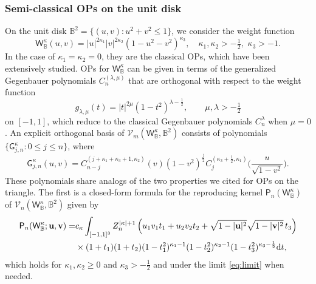 \documentclass{amsart}
\theoremstyle{remark}
\def\d{\mathrm{d}}
\def\sG{{\mathsf G}}
\def\sP{{\mathsf P}}
\def\sW{{\mathsf W}}
\def\k{{\kappa}}
\def\l{{\lambda}}
\def\ub{{\mathbf u}}
\def\vb{{\mathbf v}}
\def\CV{{\mathcal V}}
\def\BB{{\mathbb B}}
\def\f{\frac}
\begin{document}
\subsubsection{Semi-classical OPs on the unit disk}
On the unit disk $\BB^2 = \{(u,v): u^2+v^2 \le 1\}$, we consider the weight function 
\begin{equation}\label{eq:WBk}
    \sW^{\k}_\BB (u,v) = |u|^{2\k_1} |v|^{2\k_2} \left(1-u^2-v^2\right)^{\k_3}, \quad \k_1, \k_2 > -\tfrac12, \,\, \k_3 > -1.
\end{equation}
In the case of $\k_1 = \k_2 = 0$, they are the classical OPs, which have been extensively studied. OPs for
$\sW^\k_\BB$ can be given in terms of the generalized Gegenbauer polynomials $C_n^{(\l,\mu)}$ that are 
orthogonal with respect to the weight function
$$
    g_{\l,\mu} (t) = |t|^{2 \mu} (1-t^2)^{\l-\f12}, \qquad \mu, \l > -\tfrac12 
$$
on $[-1,1]$, which reduce to the classical Gegenbauer polynomials $C_n^\l$ when $\mu  = 0$. 
 An explicit orthogonal basis of $\CV_m(\sW^{\k}_\BB, \BB^2)$ consists of 
polynomials $\{\sG_{j,n}^{\k}: 0 \le j \le n\}$, where \cite{DX} 
\begin{equation}\label{eq:OP_disk}
  \sG_{j,n}^\k (u,v) = C_{n-j}^{(j + \k_1+\k_3 +1,\k_2)}(v) (1-v^2)^{\f{j}{2}} 
                C_j^{(\k_3+\f12,\k_1)} \bigg(\frac{u}{\sqrt{1-v^2}} \bigg). 
\end{equation}
These polynomials share analogs of the two properties we cited for OPs on the triangle. The first is 
a closed-form formula for the reproducing kernel $\sP_n(\sW^\k_\BB)$ of $\CV_n(\sW^\k_\BB, \BB^2)$ 
given by \cite[Theorem 8.1.16]{DX}
\begin{align} \label{eq:reprodB}
\sP_n(\sW^\k_\BB; \ub,\vb) = &  c_\k \int_{[-1,1]^3} Z_n^{|\k|+1} \left(u_1 v_1 t_1+ u_2 v_2 t_2 + 
  \sqrt{1-|\ub|^2} \sqrt{1-|\vb|^2}\, t_3 \right) \\
 & \times (1+t_1)(1+t_2) (1-t_1^2)^{\k_1-1} (1-t_2^2)^{\k_2-1}  (1-t_3^2)^{\k_3-\f12}\d t, \notag
\end{align}
which holds for $\k_1, \k_2 \ge 0$ and $\k_3 > -\f12$ and under the limit \eqref{eq:limit} when needed. 
\end{document}
